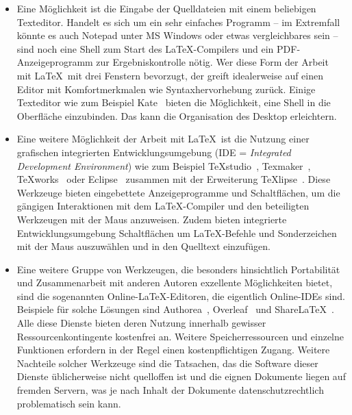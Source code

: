 \begin{itemize}
	\item Eine Möglichkeit ist die Eingabe der Quelldateien mit einem beliebigen Texteditor. Handelt es sich um ein sehr einfaches Programm -- im Extremfall könnte es auch Notepad unter MS Windows oder etwas vergleichbares sein -- sind noch eine Shell zum Start des \LaTeX-Compilers und ein PDF-Anzeigeprogramm zur Ergebniskontrolle nötig. Wer diese Form der Arbeit mit \LaTeX\ mit drei Fenstern bevorzugt, der greift idealerweise auf einen Editor mit Komfortmerkmalen wie Syntaxhervorhebung zurück.
	Einige Texteditor wie zum Beispiel Kate~\cite{Katewebpage} bieten die Möglichkeit, eine Shell in die Oberfläche einzubinden. Das kann die Organisation des Desktop erleichtern.
    
    \item Eine weitere Möglichkeit der Arbeit mit \LaTeX\ ist die Nutzung einer grafischen integrierten Entwicklungsumgebung (IDE = \textsl{Integrated Development Environment}) wie zum Beispiel \TeX studio~\cite{TeXstudioWebseite}, Texmaker~\cite{TeXmakerWebseite}, TeXworks~\cite{TeXworksWebseite} oder Eclipse~\cite{EclipseWebseite} zusammen mit der Erweiterung TeXlipse~\cite{TeXlipseWebseite}. Diese Werkzeuge bieten eingebettete Anzeigeprogramme und Schaltflächen, um die gängigen Interaktionen mit dem \LaTeX-Compiler und den beteiligten Werkzeugen mit der Maus anzuweisen. Zudem bieten integrierte Entwicklungsumgebung Schaltflächen um \LaTeX-Befehle und Sonderzeichen mit der Maus auszuwählen und in den Quelltext einzufügen.

    \item Eine weitere Gruppe von Werkzeugen, die besonders hinsichtlich Portabilität und Zusammenarbeit mit anderen Autoren exzellente Möglichkeiten bietet, sind die sogenannten Online-\LaTeX-Editoren, die eigentlich Online-IDEs sind. Beispiele für solche Lösungen sind Authorea~\cite{AuthoreaWebseite}, Overleaf~\cite{OverleafWebseite} und ShareLaTeX~\cite{ShareLaTeXWebseite}. Alle diese Dienste bieten deren Nutzung innerhalb gewisser Ressourcenkontingente kostenfrei an. Weitere Speicherressourcen und einzelne Funktionen erfordern in der Regel einen kostenpflichtigen Zugang. Weitere Nachteile solcher Werkzeuge sind die Tatsachen, das die Software dieser Dienste üblicherweise nicht quelloffen ist und die eignen Dokumente liegen auf fremden Servern, was je nach Inhalt der Dokumente datenschutzrechtlich problematisch sein kann.
\end{itemize}







